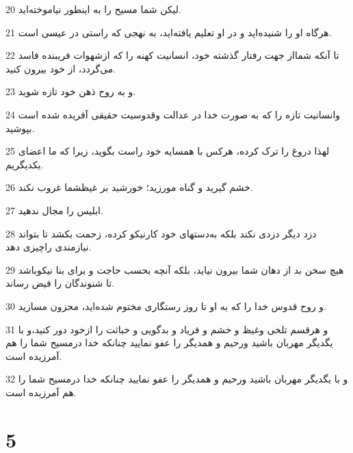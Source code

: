 \par 20 لیکن شما مسیح را به اینطور نیاموخته‌اید.
\par 21 هرگاه او را شنیده‌اید و در او تعلیم یافته‌اید، به نهجی که راستی در عیسی است.
\par 22 تا آنکه شمااز جهت رفتار گذشته خود، انسانیت کهنه را که ازشهوات فریبنده فاسد می‌گردد، از خود بیرون کنید.
\par 23 و به روح ذهن خود تازه شوید.
\par 24 وانسانیت تازه را که به صورت خدا در عدالت وقدوسیت حقیقی آفریده شده است بپوشید.
\par 25 لهذا دروغ را ترک کرده، هرکس با همسایه خود راست بگوید، زیرا که ما اعضای یکدیگریم.
\par 26 خشم گیرید و گناه مورزید؛ خورشید بر غیظشما غروب نکند.
\par 27 ابلیس را مجال ندهید.
\par 28 دزد دیگر دزدی نکند بلکه به‌دستهای خود کارنیکو کرده، زحمت بکشد تا بتواند نیازمندی راچیزی دهد.
\par 29 هیچ سخن بد از دهان شما بیرون نیاید، بلکه آنچه بحسب حاجت و برای بنا نیکوباشد تا شنوندگان را فیض رساند.
\par 30 و روح قدوس خدا را که به او تا روز رستگاری مختوم شده‌اید، محزون مسازید.
\par 31 و هرقسم تلخی وغیظ و خشم و فریاد و بدگویی و خباثت را ازخود دور کنید،و با یگدیگر مهربان باشید ورحیم و همدیگر را عفو نمایید چنانکه خدا درمسیح شما را هم آمرزیده است.
\par 32 و با یگدیگر مهربان باشید ورحیم و همدیگر را عفو نمایید چنانکه خدا درمسیح شما را هم آمرزیده است.

\chapter{5}


